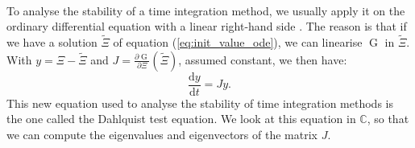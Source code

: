         \paragraph{}
        To analyse the stability of a time integration method, we usually apply it on the ordinary differential equation with a linear right-hand side \cite{HairerWanner1996}.
        The reason is that if we have a solution $\tilde{\Xi}$ of equation (\ref{eq:init_value_ode}), we can linearise $\operatorname{G}$ in $\tilde{\Xi}$.
        With $y = \Xi - \tilde{\Xi}$ and $J = \frac{\partial \operatorname{G}}{\partial \Xi}\left(\tilde{\Xi}\right)$, assumed constant, we then have:
        \begin{equation}\label{eq:dahlquist}
          \frac{\mathrm{d} y}{\mathrm{d} t} = J y .
        \end{equation}
        This new equation used to analyse the stability of time integration methods is the one called the Dahlquist test equation.
        We look at this equation in $\mathbb{C}$, so that we can compute the eigenvalues and eigenvectors of the matrix $J$.

